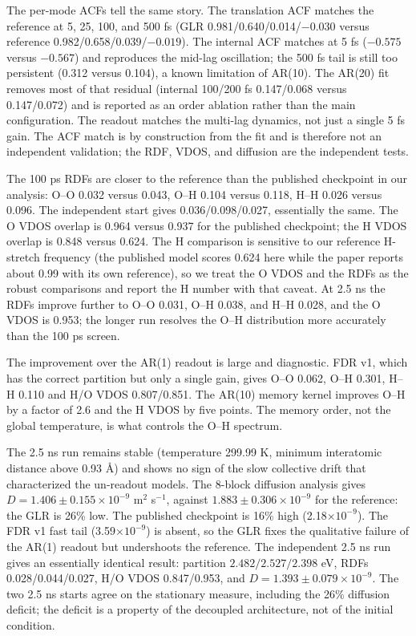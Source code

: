 The per-mode ACFs tell the same story. The translation ACF matches the reference at 5, 25, 100,
and 500 fs (GLR 0.981/0.640/0.014/\(-0.030\) versus reference 0.982/0.658/0.039/\(-0.019\)). The
internal ACF matches at 5 fs (\(-0.575\) versus \(-0.567\)) and reproduces the mid-lag oscillation;
the 500 fs tail is still too persistent (0.312 versus 0.104), a known limitation of AR(10). The
AR(20) fit removes most of that residual (internal 100/200 fs 0.147/0.068 versus 0.147/0.072) and
is reported as an order ablation rather than the main configuration. The readout matches the
multi-lag dynamics, not just a single 5 fs gain. The ACF match is by construction from the fit and
is therefore not an independent validation; the RDF, VDOS, and diffusion are the independent
tests.

The 100 ps RDFs are closer to the reference than the published checkpoint in our analysis:
O--O 0.032 versus 0.043, O--H 0.104 versus 0.118, H--H 0.026 versus 0.096. The independent start
gives 0.036/0.098/0.027, essentially the same. The O VDOS overlap is 0.964 versus 0.937 for the
published checkpoint; the H VDOS overlap is 0.848 versus 0.624. The H comparison is sensitive to
our reference H-stretch frequency (the published model scores 0.624 here while the paper reports
about 0.99 with its own reference), so we treat the O VDOS and the RDFs as the robust comparisons
and report the H number with that caveat. At 2.5 ns the RDFs improve further to
O--O 0.031, O--H 0.038, and H--H 0.028, and the O VDOS is 0.953; the longer run resolves the
O--H distribution more accurately than the 100 ps screen.

The improvement over the AR(1) readout is large and diagnostic. FDR v1, which has the correct
partition but only a single gain, gives O--O 0.062, O--H 0.301, H--H 0.110 and H/O VDOS 0.807/0.851.
The AR(10) memory kernel improves O--H by a factor of 2.6 and the H VDOS by five points. The
memory order, not the global temperature, is what controls the O--H spectrum.

The 2.5 ns run remains stable (temperature 299.99 K, minimum interatomic distance above 0.93 \AA)
and shows no sign of the slow collective drift that characterized the un-readout models. The
8-block diffusion analysis gives \(D=1.406\pm0.155\times10^{-9}\) m\(^2\) s\(^{-1}\), against
\(1.883\pm0.306\times10^{-9}\) for the reference: the GLR is 26\% low. The published checkpoint is
16\% high (2.18\(\times10^{-9}\)). The FDR v1 fast tail (3.59\(\times10^{-9}\)) is absent, so the
GLR fixes the qualitative failure of the AR(1) readout but undershoots the reference. The
independent 2.5 ns run gives an essentially identical result: partition
\(2.482/2.527/2.398\) eV, RDFs 0.028/0.044/0.027, H/O VDOS 0.847/0.953, and
\(D=1.393\pm0.079\times10^{-9}\). The two 2.5 ns starts agree on the stationary measure, including
the 26\% diffusion deficit; the deficit is a property of the decoupled architecture, not of the
initial condition.

